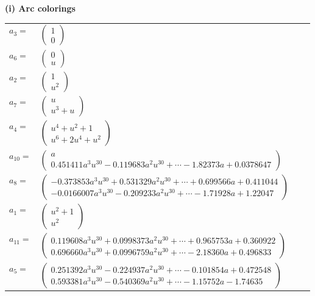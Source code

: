 \documentclass[1p]{elsarticle_modified}
\theoremstyle{definition}
\begin{document}
\flushleft \textbf{(i) Arc colorings}\\
\begin{tabular}{m{7pt} m{180pt} m{7pt} m{180pt} }
\flushright $a_{3}=$&$\begin{pmatrix}1\\0\end{pmatrix}$ \\
\flushright $a_{6}=$&$\begin{pmatrix}0\\u\end{pmatrix}$ \\
\flushright $a_{2}=$&$\begin{pmatrix}1\\u^2\end{pmatrix}$ \\
\flushright $a_{7}=$&$\begin{pmatrix}u\\u^3+u\end{pmatrix}$ \\
\flushright $a_{4}=$&$\begin{pmatrix}u^4+u^2+1\\u^6+2 u^4+u^2\end{pmatrix}$ \\
\flushright $a_{10}=$&$\begin{pmatrix}a\\0.451411 a^{3} u^{30}-0.119683 a^{2} u^{30}+\cdots-1.82373 a+0.0378647\end{pmatrix}$ \\
\flushright $a_{8}=$&$\begin{pmatrix}-0.373853 a^{3} u^{30}+0.531329 a^{2} u^{30}+\cdots+0.699566 a+0.411044\\-0.0166007 a^{3} u^{30}-0.209233 a^{2} u^{30}+\cdots-1.71928 a+1.22047\end{pmatrix}$ \\
\flushright $a_{1}=$&$\begin{pmatrix}u^2+1\\u^2\end{pmatrix}$ \\
\flushright $a_{11}=$&$\begin{pmatrix}0.119608 a^{3} u^{30}+0.0998373 a^{2} u^{30}+\cdots+0.965753 a+0.360922\\0.696660 a^{3} u^{30}+0.0996759 a^{2} u^{30}+\cdots-2.18360 a+0.496833\end{pmatrix}$ \\
\flushright $a_{5}=$&$\begin{pmatrix}0.251392 a^{3} u^{30}-0.224937 a^{2} u^{30}+\cdots-0.101854 a+0.472548\\0.593381 a^{3} u^{30}-0.540369 a^{2} u^{30}+\cdots-1.15752 a-1.74635\end{pmatrix}$ \\

\end{tabular}
\end{document}
